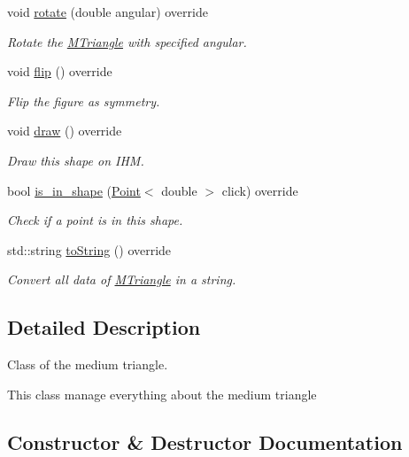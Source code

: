 \begin{DoxyCompactItemize}
void \hyperlink{classMTriangle_a4be29553eeddf99c367b1ec220bc102b}{rotate} (double angular) override
\begin{DoxyCompactList}\small\item\em Rotate the \hyperlink{classMTriangle}{M\+Triangle} with specified angular. \end{DoxyCompactList}\item 
\mbox{\label{classMTriangle_a6258b96b57c1892098f84a5a5fa0f976}} 
void \hyperlink{classMTriangle_a6258b96b57c1892098f84a5a5fa0f976}{flip} () override
\begin{DoxyCompactList}\small\item\em Flip the figure as symmetry. \end{DoxyCompactList}\item 
\mbox{\label{classMTriangle_a7801818e2188f39ba89a2a82df8fa5fe}} 
void \hyperlink{classMTriangle_a7801818e2188f39ba89a2a82df8fa5fe}{draw} () override
\begin{DoxyCompactList}\small\item\em Draw this shape on I\+HM. \end{DoxyCompactList}\item 
bool \hyperlink{classMTriangle_a8d3d737a903823bf1a631cbb004a799c}{is\+\_\+in\+\_\+shape} (\hyperlink{classPoint}{Point}$<$ double $>$ click) override
\begin{DoxyCompactList}\small\item\em Check if a point is in this shape. \end{DoxyCompactList}\item 
std\+::string \hyperlink{classMTriangle_a7d1fd825592dffa6ac05b3398a8c105a}{to\+String} () override
\begin{DoxyCompactList}\small\item\em Convert all data of \hyperlink{classMTriangle}{M\+Triangle} in a string. \end{DoxyCompactList}\end{DoxyCompactItemize}


\subsection{Detailed Description}
Class of the medium triangle. 

This class manage everything about the medium triangle 

\subsection{Constructor \& Destructor Documentation}
\mbox{\label{classMTriangle_a428bc13e1f5299369e5c78602aae544b}} 
